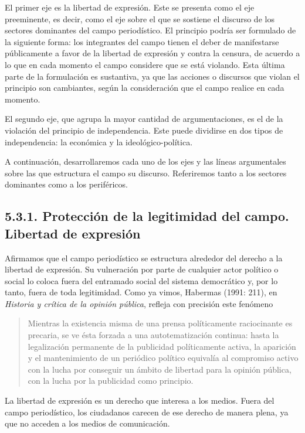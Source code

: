 El primer eje es la libertad de expresión. Este se presenta como el eje preeminente, es decir, como el eje sobre el que se sostiene el discurso de los sectores dominantes del campo periodístico. El principio podría ser formulado de la siguiente forma: los integrantes del campo tienen el deber de manifestarse públicamente a favor de la libertad de expresión y contra la censura, de acuerdo a lo que en cada momento el campo considere que se está violando. Esta última parte de la formulación es sustantiva, ya que las acciones o discursos que violan el principio son cambiantes, según la consideración que el campo realice en cada momento.

El segundo eje, que agrupa la mayor cantidad de argumentaciones, es el de la violación del principio de independencia. Este puede dividirse en dos tipos de independencia: la económica y la ideológico-política.

A continuación, desarrollaremos cada uno de los ejes y las líneas argumentales sobre las que estructura el campo su discurso. Referiremos tanto a los sectores dominantes como a los periféricos.

\subsection{5.3.1. Protección de la legitimidad del campo. Libertad de expresión}

Afirmamos que el campo periodístico se estructura alrededor del derecho a la libertad de expresión. Su vulneración por parte de cualquier actor político o social lo coloca fuera del entramado social del sistema democrático y, por lo tanto, fuera de toda legitimidad. Como ya vimos, Habermas (1991: 211), en \emph{Historia y crítica de la opinión pública}, refleja con precisión este fenómeno

\begin{quote}
Mientras la existencia misma de una prensa políticamente raciocinante es precaria, se ve ésta forzada a una autotematización continua: hasta la legalización permanente de la publicidad políticamente activa, la aparición y el mantenimiento de un periódico político equivalía al compromiso activo con la lucha por conseguir un ámbito de libertad para la opinión pública, con la lucha por la publicidad como principio.
\end{quote}

La libertad de expresión es un derecho que interesa a los medios. Fuera del campo periodístico, los ciudadanos carecen de ese derecho de manera plena, ya que no acceden a los medios de comunicación.

